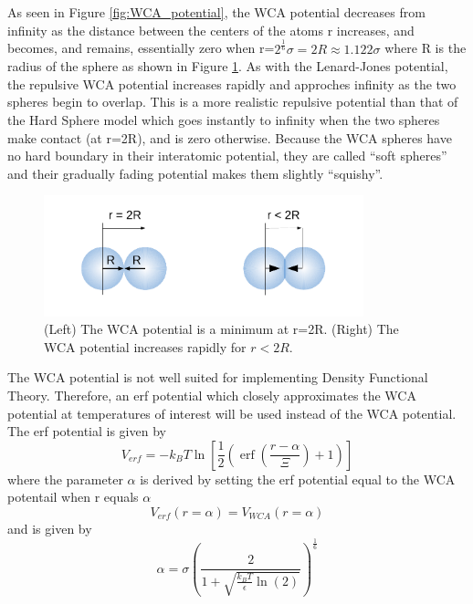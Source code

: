 \documentclass[double,12pt]{beavtex}
\begin{document}
\noindent As seen in Figure \ref{fig:WCA_potential}, the WCA potential decreases from infinity as the distance between the centers of the atoms r increases, and becomes, and remains, essentially zero when r=$2^\frac{1}{6}\sigma=2R\approx{1.122}\sigma$ where R is the radius of the sphere as shown in Figure \ref{fig:TwoSpheres}. As with the Lenard-Jones potential, the repulsive WCA potential increases rapidly and approches infinity as the two spheres begin to overlap. This is a more realistic repulsive potential than that of the Hard Sphere model which goes instantly to infinity when the two spheres make contact (at r=2R), and is zero otherwise. Because the WCA spheres have no hard boundary in their interatomic potential, they are called ``soft spheres'' and their gradually fading potential makes them slightly ``squishy''.

\begin{figure}[h!]
    \centering
    \includegraphics[height=3.5cm]{TwoSpheres.pdf} 
    \caption{(Left) The WCA potential is a minimum at r=2R. 
             (Right) The WCA potential increases rapidly for $r<2R$.}
    \label{fig:TwoSpheres}
    \end{figure} 

The WCA potential is not well suited for implementing Density Functional Theory.  
Therefore, an erf potential which closely approximates the WCA potential at temperatures 
of interest will be used instead of the WCA potential. The erf potential is given by 
\begin{equation}
	{V_{erf}=-k_BT\ln\left[\frac{1}{2}\left(\operatorname{erf}\left(\frac{r-\alpha}{\Xi}\right)+1\right)\right]}
\end{equation} 
where the parameter $\alpha$ is derived by setting the erf potential equal to the WCA 
potentail when r equals $\alpha$ 
\begin{displaymath}{V_{erf}(r=\alpha)=V_{WCA}(r=\alpha)}\end{displaymath} 
and is given by 
\begin{equation}\label{alphaT}
	{\alpha=\sigma\left(\frac{2}{1+\sqrt{\frac{k_BT}{\epsilon}\ln(2)}}\right)^\frac{1}{6}}
\end{equation} 
\end{document}

